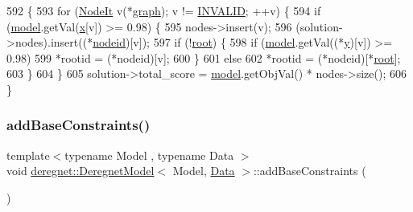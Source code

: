 \begin{DoxyCode}
592                                                                                                            
                        \{
593     \textcolor{keywordflow}{for} (\hyperlink{namespacederegnet_ac34314e1b5f456fc6d1bb9d96316de4a}{NodeIt} v(*\hyperlink{classderegnet_1_1DeregnetModel_a3cd2f54b8e061ef5bed32708d9bc1ef1}{graph}); v != \hyperlink{usinglemon_8hpp_adf770fe2eec438e3758ffe905dbae208}{INVALID}; ++v) \{
594         \textcolor{keywordflow}{if} (\hyperlink{classderegnet_1_1DeregnetModel_a30d525de2086e342b33fe3e45ede4947}{model}.getVal(\hyperlink{classderegnet_1_1DeregnetModel_a360c980f3fec4dfbab50e9bb06a933a8}{x}[v]) >= 0.98) \{
595             nodes->insert(v);
596             (solution->nodes).insert((*\hyperlink{classderegnet_1_1DeregnetModel_adfebf6f9983c9ccc934469a79381fb78}{nodeid})[v]);
597             \textcolor{keywordflow}{if} (!\hyperlink{classderegnet_1_1DeregnetModel_a54b20393a0e26d65935d387685d7fe96}{root}) \{
598                 \textcolor{keywordflow}{if} (\hyperlink{classderegnet_1_1DeregnetModel_a30d525de2086e342b33fe3e45ede4947}{model}.getVal((*\hyperlink{classderegnet_1_1DeregnetModel_ae76df61afe302b939165facf3dd21ac8}{y})[v]) >= 0.98)
599                     *rootid = (*nodeid)[v];
600             \}
601             \textcolor{keywordflow}{else}
602                 *rootid = (*nodeid)[*\hyperlink{classderegnet_1_1DeregnetModel_a54b20393a0e26d65935d387685d7fe96}{root}];
603         \}
604     \}
605     solution->total\_score = \hyperlink{classderegnet_1_1DeregnetModel_a30d525de2086e342b33fe3e45ede4947}{model}.getObjVal() * nodes->size();
606 \}
\end{DoxyCode}
\mbox{\label{classderegnet_1_1DeregnetModel_ae246d2286429b83b32e727da987a5817}} 
\subsubsection{\texorpdfstring{add\+Base\+Constraints()}{addBaseConstraints()}}
{\footnotesize\ttfamily template$<$typename Model , typename Data $>$ \\
void \hyperlink{classderegnet_1_1DeregnetModel}{deregnet\+::\+Deregnet\+Model}$<$ Model, \hyperlink{avgdrgnt_8cpp_a1d1235306db276e9b36acba1db1509e8}{Data} $>$\+::add\+Base\+Constraints (\begin{DoxyParamCaption}{ }\end{DoxyParamCaption})}



